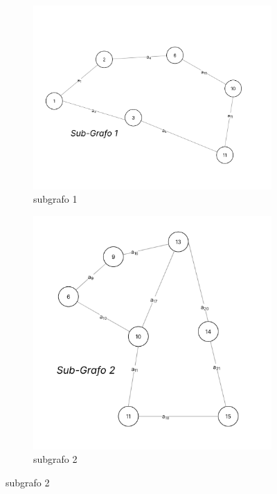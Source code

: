 \begin{figure}[!htb]
	\centering %

	\begin{subfigure}[b]{0.48\textwidth}
		\centering
		\includegraphics[width=\textwidth]{figuras/subgrafos/subgrafo1.png} %
		\caption{subgrafo 1}
		\label{fig:imagem1}
	\end{subfigure}
	\hfill %
	\begin{subfigure}[b]{0.48\textwidth}
		\centering
		\includegraphics[width=\textwidth]{figuras/subgrafos/subgrafo2.png} %
		\caption{subgrafo 2}
		\label{fig:imagem2}
	\end{subfigure}


\end{figure}
